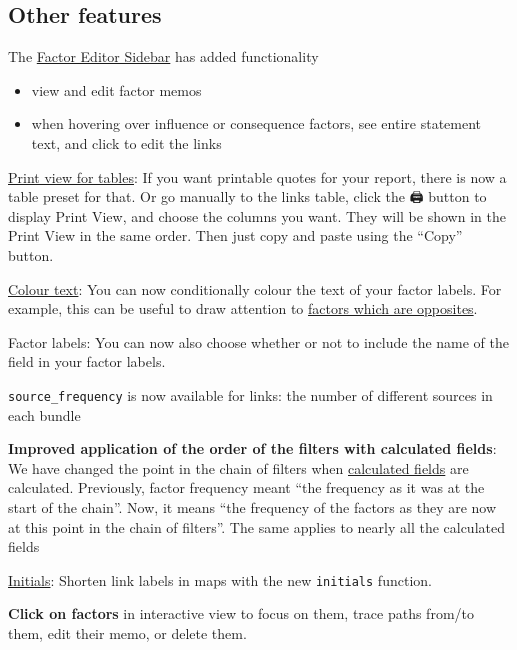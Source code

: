 \documentclass[
]{book}
\providecommand{\tightlist}{%
  \setlength{\itemsep}{0pt}\setlength{\parskip}{0pt}}
\begin{document}
\hypertarget{other-features}{%
\subsection{Other features}\label{other-features}}

The \href{xfactor-editor-sidebar}{Factor Editor Sidebar} has added functionality

\begin{itemize}
\tightlist
\item
  view and edit factor memos
\item
  when hovering over influence or consequence factors, see entire statement text, and click to edit the links
\end{itemize}

\href{xprint-view-tables}{Print view for tables}: If you want printable quotes for your report, there is now a table preset for that. Or go manually to the links table, click the 🖨️ button to display Print View, and choose the columns you want. They will be shown in the Print View in the same order. Then just copy and paste using the ``Copy'' button.

\protect\hyperlink{xcolour-text}{Colour text}: You can now conditionally colour the text of your factor labels. For example, this can be useful to draw attention to \href{https://causalmap.shinyapps.io/CM2test/?s=651}{factors which are opposites}.

Factor labels: You can now also choose whether or not to include the name of the field in your factor labels.

\texttt{source\_frequency} is now available for links: the number of different sources in each bundle

\textbf{Improved application of the order of the filters with calculated fields}: We have changed the point in the chain of filters when \protect\hyperlink{xcalculated-fields}{calculated fields} are calculated. Previously, factor frequency meant ``the frequency as it was at the start of the chain''. Now, it means ``the frequency of the factors as they are now at this point in the chain of filters''. The same applies to nearly all the calculated fields

\protect\hyperlink{xinitials}{Initials}: Shorten link labels in maps with the new \texttt{initials} function.

\textbf{Click on factors} in interactive view to focus on them, trace paths from/to them, edit their memo, or delete them.
\end{document}
